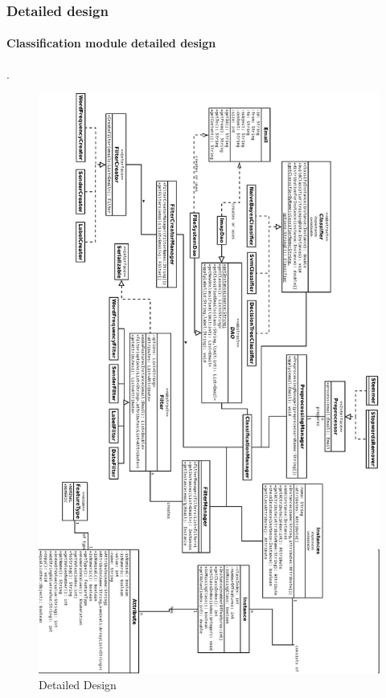 \newpage
\subsubsection{Detailed design}
\paragraph{Classification module detailed design}
.\\
\begin{figure}[H]
  \centering
  \includegraphics[width=12cm]{design.jpeg}
  \caption[Detailed Design] {Detailed Design}
\end{figure}



